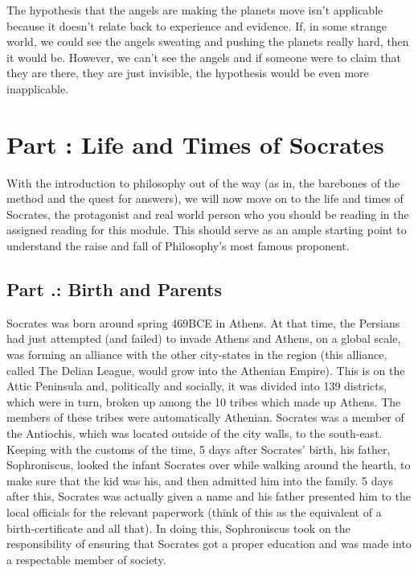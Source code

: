  The hypothesis that the angels are making the planets move isn't applicable because it doesn't relate back to experience and evidence. If, in some strange world, we could see the angels sweating and pushing the planets really hard, then it would be. However, we can't see the angels and if someone were to claim that they are there, they are just invisible, the hypothesis would be even more inapplicable.


\chapter{Part \thechapcount: Life and Times of Socrates}\setcounter{seccount}{1}

With the introduction to philosophy out of the way (as in, the barebones of the method and the quest for answers), we will now move on to the life and times of Socrates, the protagonist and real world person who you should be reading in the assigned reading for this module. This should serve as an ample starting point to understand the raise and fall of Philosophy's most famous proponent.
\section{Part \thechapcount.\theseccount: Birth and Parents}

Socrates was born around spring 469BCE in Athens. At that time, the Persians had just attempted  (and failed) to invade Athens and Athens, on a global scale, was forming an alliance with the other city-states in the region (this alliance, called The Delian League, would grow into the Athenian Empire). This is on the Attic Peninsula and, politically and socially, it was divided into 139 districts, which were in turn, broken up among the 10 tribes which made up Athens. The members of these tribes were automatically Athenian. Socrates was a member of the Antiochis, which was located outside of the city walls, to the south-east. Keeping with the customs of the time, 5 days after Socrates' birth, his father, Sophroniscus, looked the infant Socrates over while walking around the hearth, to make sure that the kid was his, and then admitted him into the family. 5 days after this, Socrates was actually given a name and his father presented him to the local officials for the relevant paperwork (think of this as the equivalent of a birth-certificate and all that). In doing this, Sophroniscus took on the responsibility of ensuring that Socrates got a proper education and was made into a respectable member of society.
